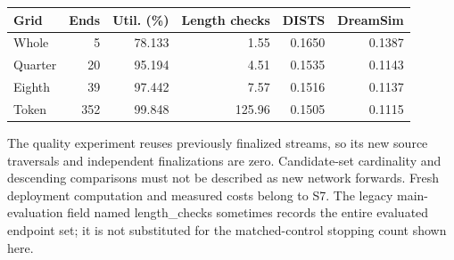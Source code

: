 \documentclass[10pt,letterpaper]{article}
\begin{document}
\begin{longtable}{@{}lrrrrr@{}}\toprule
Grid & Ends & Util. (\%) & Length checks & DISTS & DreamSim\\\midrule\endhead
Whole & 5 & 78.133 & 1.55 & 0.1650 & 0.1387\\
Quarter & 20 & 95.194 & 4.51 & 0.1535 & 0.1143\\
Eighth & 39 & 97.442 & 7.57 & 0.1516 & 0.1137\\
Token & 352 & 99.848 & 125.96 & 0.1505 & 0.1115\\
\bottomrule\end{longtable}

The quality experiment reuses previously finalized streams, so its new source traversals and independent finalizations are zero. Candidate-set cardinality and descending comparisons must not be described as new network forwards. Fresh deployment computation and measured costs belong to S7. The legacy main-evaluation field named length\_checks sometimes records the entire evaluated endpoint set; it is not substituted for the matched-control stopping count shown here.
\end{document}
